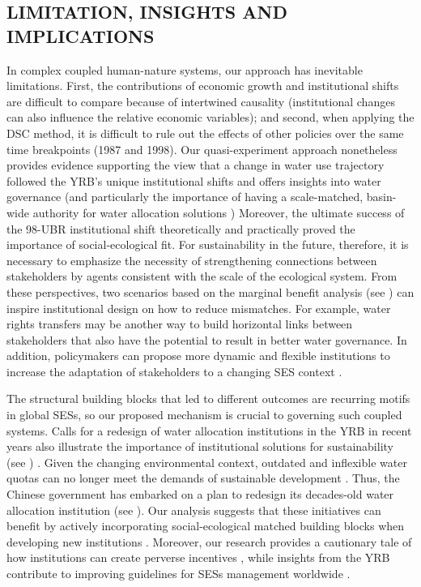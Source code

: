 \subsection{LIMITATION, INSIGHTS AND IMPLICATIONS}
\label{discussion-4}

In complex coupled human-nature systems, our approach has inevitable limitations.
First, the contributions of economic growth and institutional shifts are difficult to compare because of intertwined causality (institutional changes can also influence the relative economic variables);
and second, when applying the DSC method, it is difficult to rule out the effects of other policies over the same time breakpoints (1987 and 1998).
Our quasi-experiment approach nonetheless provides evidence supporting the view that a change in water use trajectory followed the YRB's unique institutional shifts and offers insights into water governance (and particularly the importance of having a scale-matched, basin-wide authority for water allocation solutions \cite{bodin2017b, ostrom2009, reyers2018})
Moreover, the ultimate success of the 98-UBR institutional shift theoretically and practically proved the importance of social-ecological fit.
For sustainability in the future, therefore, it is necessary to emphasize the necessity of strengthening connections between stakeholders by agents consistent with the scale of the ecological system.
From these perspectives, two scenarios based on the marginal benefit analysis (see \textit{}) can inspire institutional design on how to reduce mismatches.
For example, water rights transfers may be another way to build horizontal links between stakeholders that also have the potential to result in better water governance.
In addition, policymakers can propose more dynamic and flexible institutions to increase the adaptation of stakeholders to a changing SES context \cite{reyers2018}.

The structural building blocks that led to different outcomes are recurring motifs in global SESs, so our proposed mechanism is crucial to governing such coupled systems.
Calls for a redesign of water allocation institutions in the YRB in recent years also illustrate the importance of institutional solutions for sustainability (see \textit{}) \cite{yu2019}.
Given the changing environmental context, outdated and inflexible water quotas can no longer meet the demands of sustainable development \cite{wang2019a}.
Thus, the Chinese government has embarked on a plan to redesign its decades-old water allocation institution (see \textit{}).
Our analysis suggests that these initiatives can benefit by actively incorporating social-ecological matched building blocks when developing new institutions \cite{bodin2017b}.
Moreover, our research provides a cautionary tale of how institutions can create perverse incentives \cite{hegwood2022}, while insights from the YRB contribute to improving guidelines for SESs management worldwide \cite{muneepeerakul2017, leslie2015}.
